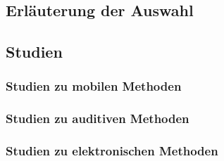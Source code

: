 \subsection{Erläuterung der Auswahl}

\subsection{Studien}
\subsubsection{Studien zu mobilen Methoden}
\subsubsection{Studien zu auditiven Methoden}
\subsubsection{Studien zu elektronischen Methoden}




